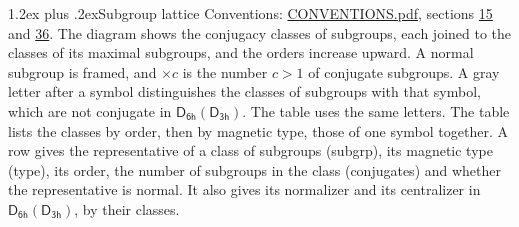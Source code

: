 \documentclass[10pt,a4paper]{article}
\makeatletter
\renewcommand\section{\@startsection{section}{1}{\z@}{-3ex plus -1ex minus -.2ex}%
  {1.2ex plus .2ex}{\normalfont\large\sffamily\bfseries\color{parttitle}}}
\numberwithin{equation}{section}
\newcommand{\grp}[1]{\mathsf{#1}}
\makeatother
\begin{document}
\section{Subgroup lattice}\label{s:subgroups}
Conventions: \href{../../CONVENTIONS.pdf}{CONVENTIONS.pdf}, sections \href{../../../rotation/CONVENTIONS.pdf\#conv.15}{15} and \href{../../CONVENTIONS.pdf\#conv.36}{36}.
The diagram shows the conjugacy classes of subgroups, each joined to the classes of its maximal subgroups, and the orders increase upward. \label{n:index.conjugates.c}\label{n:mark.conjugates}A normal subgroup is framed, and ${\times}c$ is the number $c > 1$ of conjugate subgroups. \label{n:mark.letter}A gray letter after a symbol distinguishes the classes of subgroups with that symbol, which are not conjugate in $\grp{D_{6h}}(\grp{D_{3h}})$. The table uses the same letters. The table lists the classes by order, then by magnetic type, those of one symbol together. \label{n:head.subgroup}\label{n:head.magnetic.type}\label{n:head.order}\label{n:head.conjugates}\label{n:head.normal}A row gives the representative of a class of subgroups (subgrp), its magnetic type (type), its order, the number of subgroups in the class (conjugates) and whether the representative is normal. \label{n:head.normalizer}\label{n:head.centralizer}It also gives its normalizer and its centralizer in $\grp{D_{6h}}(\grp{D_{3h}})$, by their classes. 
\end{document}
